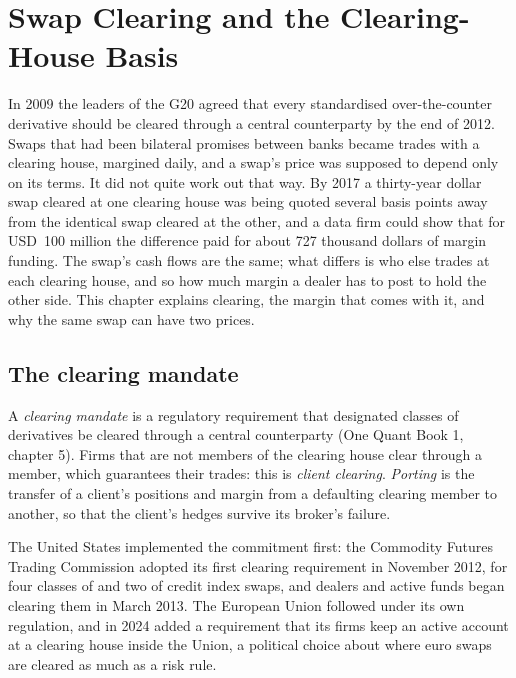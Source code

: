 \chapter{Swap Clearing and the Clearing-House Basis}\label{ch:m2:swap-clearing-and-the-ccp-basis}

In 2009 the leaders of the G20 agreed that every standardised over-the-counter
derivative should be cleared through a central counterparty by the end of
2012. Swaps that had been bilateral promises between banks became trades
with a clearing house, margined daily, and a swap's price was supposed to
depend only on its terms. It did not quite work out that way. By 2017 a
thirty-year dollar swap cleared at one clearing house was being quoted several
basis points away from the identical swap cleared at the other, and a data
firm could show that for USD~100 million the difference paid for about 727
thousand dollars of margin funding. The swap's cash flows are the same; what
differs is who else trades at each clearing house, and so how much margin a
dealer has to post to hold the other side. This chapter explains clearing,
the margin that comes with it, and why the same swap can have two prices.

\section{The clearing mandate}

\begin{definition}\label{def:m2:swap-clearing-and-the-ccp-basis:mandate}
A \emph{clearing mandate} is a regulatory requirement
that designated classes of derivatives be cleared through a central
counterparty (One Quant Book 1, chapter 5). Firms that are not members of the
clearing house clear through a member, which guarantees their trades: this is
\emph{client clearing}. \emph{Porting} is
the transfer of a client's positions and margin from a defaulting clearing
member to another, so that the client's hedges survive its broker's failure.
\end{definition}

The United States implemented the commitment first: the Commodity Futures
Trading Commission adopted its first clearing requirement in November 2012, for
four classes of  and two of credit index swaps, and dealers
and active funds began clearing them in March 2013. The European Union followed
under its own regulation, and in 2024 added a requirement that its firms keep an
active account at a clearing house inside the Union, a political choice about
where euro swaps are cleared as much as a risk rule.

